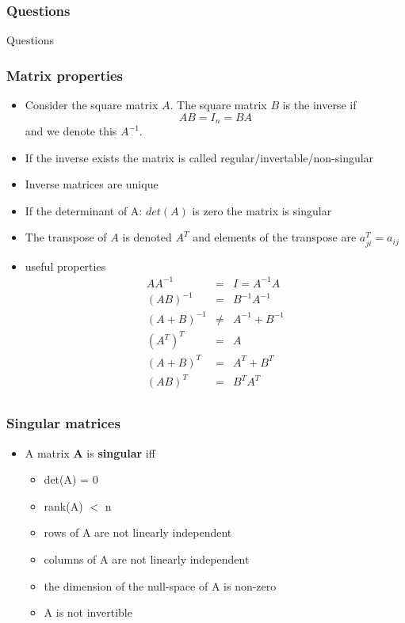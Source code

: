 \documentclass[10pt]{beamer}
\begin{document}
\begin{frame}
  \frametitle{Questions}
  \centerline{\Huge Questions}
\end{frame}

\begin{frame}
  \frametitle{Matrix properties}
  \begin{itemize}
  \item Consider the square matrix $A$. The square matrix $B$ is the inverse if
    \[ AB = I_n = BA \]
    and we denote this $A^{-1}$. 
  \item If the inverse exists the matrix is called regular/invertable/non-singular
  \item Inverse matrices are unique
  \item If the determinant of A: $det(A)$ is zero the matrix is singular
  \item The transpose of $A$ is denoted $A^T$ and elements of the transpose are $a^T_{ji} = a_{ij}$
  \item useful properties
    \[
      \begin{array}{ccc}
        AA^{-1}  & = & I = A^{-1}A\\
        (AB)^{-1} & = & B^{-1} A^{-1}\\
        (A+B)^{-1} & \neq & A^{-1} + B^{-1}\\
        (A^T)^T  & = & A \\
        (A+B)^T &= & A^T + B^T \\
        (AB)^T &=& B^T A^T \\
      \end{array}
    \]
  \end{itemize}
\end{frame}

\begin{frame}
  \frametitle{Singular matrices}
  \begin{itemize}
  \item A matrix $\mathbf{A}$ is {\bf singular} iff
    \begin{itemize}
    \item det(A) = 0
    \item rank(A) $<$ n
    \item rows of A are not linearly independent
    \item columns of A are not linearly independent
    \item the dimension of the null-space of A is non-zero
    \item A is not invertible
    \end{itemize}
  \end{itemize}
\end{frame}
\end{document}

